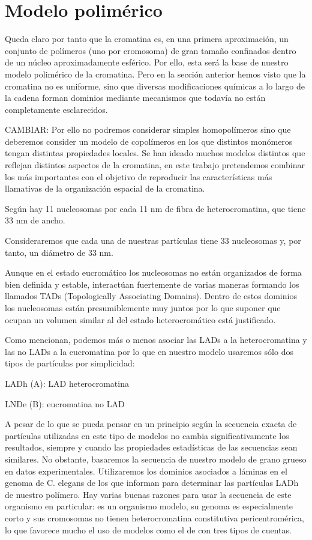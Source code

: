 \section{Modelo polimérico}

Queda claro por tanto que la cromatina es, en una primera aproximación, un conjunto de polímeros (uno por cromosoma) de gran tamaño confinados dentro de un núcleo aproximadamente esférico. Por ello, esta será la base de nuestro modelo polimérico de la cromatina. Pero en la sección anterior hemos visto que la cromatina no es uniforme, sino que diversas modificaciones químicas a lo largo de la cadena forman dominios mediante mecanismos que todavía no están completamente esclarecidos.

CAMBIAR: Por ello no podremos considerar simples homopolímeros sino que deberemos consider un modelo de copolímeros en los que distintos monómeros tengan distintas propiedades locales. Se han ideado muchos modelos distintos que reflejan distintos aspectos de la cromatina, en este trabajo pretendemos combinar los más importantes con el objetivo de reproducir las características más llamativas de la organización espacial de la cromatina.

Según \cite{Robinson2006} hay 11 nucleosomas por cada 11 nm de fibra de heterocromatina, que tiene 33 nm de ancho.

Consideraremos que cada una de nuestras partículas tiene 33 nucleosomas y, por tanto, un diámetro de 33 nm.

Aunque en el estado eucromático los nucleosomas no están organizados de forma bien definida y estable, interactúan fuertemente de varias maneras formando los llamados TADs (Topologically Associating Domains). Dentro de estos dominios los nucleosomas están presumiblemente muy juntos por lo que suponer que ocupan un volumen similar al del estado heterocromático está justificado.

Como \cite{Bajpai2021} mencionan, podemos más o menos asociar las LADs a la heterocromatina y las no LADs a la eucromatina por lo que en nuestro modelo usaremos sólo dos tipos de partículas por simplicidad:

LADh (A): LAD heterocromatina

LNDe (B): eucromatina no LAD

A pesar de lo que se pueda pensar en un principio según \cite{Bajpai2021} la secuencia exacta de partículas utilizadas en este tipo de modelos no cambia significativamente los resultados, siempre y cuando las propiedades estadísticas de las secuencias sean similares. No obstante, basaremos la secuencia de nuestro modelo de grano grueso en datos experimentales. Utilizaremos los dominios asociados a láminas en el genoma de C. elegans de los que informan \cite{Ho2014} para determinar las partículas LADh de nuestro polímero. Hay varias buenas razones para usar la secuencia de este organismo en particular: es un organismo modelo, su genoma es especialmente corto y sus cromosomas no tienen heterocromatina constitutiva pericentromérica, lo que favorece mucho el uso de modelos como el de \cite{Falk2019} con tres tipos de cuentas.

